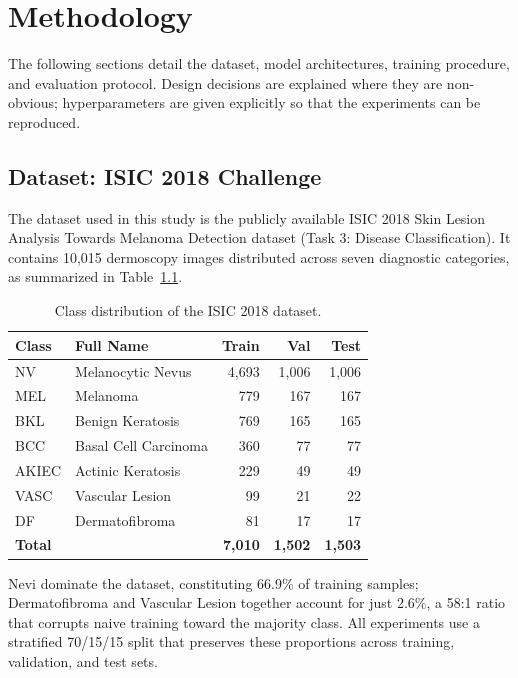 \chapter{Methodology}

The following sections detail the dataset, model architectures, training procedure, and evaluation protocol. Design decisions are explained where they are non-obvious; hyperparameters are given explicitly so that the experiments can be reproduced.

\section{Dataset: ISIC 2018 Challenge}

The dataset used in this study is the publicly available ISIC 2018 Skin Lesion Analysis Towards Melanoma Detection dataset (Task 3: Disease Classification). It contains 10,015 dermoscopy images distributed across seven diagnostic categories, as summarized in Table~\ref{tab:class_distribution}.

\begin{table}[H]
\centering
\caption{Class distribution of the ISIC 2018 dataset.}
\label{tab:class_distribution}
\begin{tabular}{llrrr}
\toprule
\textbf{Class} & \textbf{Full Name} & \textbf{Train} & \textbf{Val} & \textbf{Test} \\
\midrule
NV    & Melanocytic Nevus          & 4,693 & 1,006 & 1,006 \\
MEL   & Melanoma                   &   779 &   167 &   167 \\
BKL   & Benign Keratosis           &   769 &   165 &   165 \\
BCC   & Basal Cell Carcinoma       &   360 &    77 &    77 \\
AKIEC & Actinic Keratosis          &   229 &    49 &    49 \\
VASC  & Vascular Lesion            &    99 &    21 &    22 \\
DF    & Dermatofibroma             &    81 &    17 &    17 \\
\midrule
\textbf{Total} & & \textbf{7,010} & \textbf{1,502} & \textbf{1,503} \\
\bottomrule
\end{tabular}
\end{table}

Nevi dominate the dataset, constituting 66.9\% of training samples; Dermatofibroma and Vascular Lesion together account for just 2.6\%, a 58:1 ratio that corrupts naive training toward the majority class. All experiments use a stratified 70/15/15 split that preserves these proportions across training, validation, and test sets.

